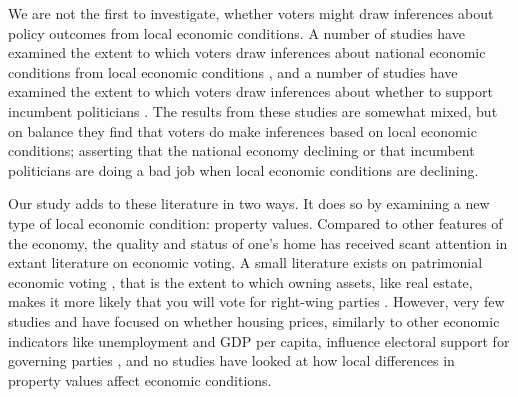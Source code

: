 \documentclass[12pt,a4paper]{article}
\begin{document}
We are not the first to investigate, whether voters might draw inferences about policy outcomes from local economic conditions. A number of studies have examined the extent to which voters draw inferences about national economic conditions from local economic conditions \citep{books1999contextual,reeves2012ecologies,anderson2011local,ansolabehere2014mecro,bisgaard2016reconsidering}, and a number of studies have examined the extent to which voters draw inferences about whether to support incumbent politicians  \citep{hansford2015reevaluating,eisenberg2004economic,kim2003spatial,healy2014presidential}. The results from these studies are somewhat mixed, but on balance they find that voters do make inferences based on local economic conditions; asserting that the national economy declining or that incumbent politicians are doing a bad job when local economic conditions are declining. 

Our study adds to these literature in two ways. It does so by examining a new type of local economic condition: property values. Compared to other features of the economy, the quality and status of one's home has received scant attention in extant literature on economic voting. A small literature exists on patrimonial economic voting \citep{nadeau2010patrimonial,stubager2013reaching}, that is the extent to which owning assets, like real estate, makes it more likely that you will vote for right-wing parties \citep[see][for a similar argument]{ansell2014political}. However, very few studies and have focused on whether housing prices, similarly to other economic indicators like unemployment and GDP per capita, influence electoral support for governing parties \citep[e.g.][]{hopkins2015economic}, and no studies have looked at how local differences in property values affect economic conditions.
\end{document}
